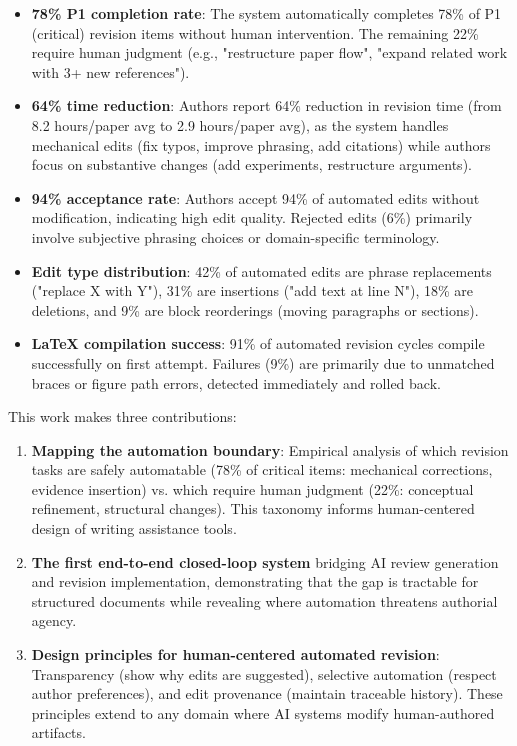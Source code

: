 \begin{itemize}
\item \textbf{78\% P1 completion rate}: The system automatically completes 78\% of P1 (critical) revision items without human intervention. The remaining 22\% require human judgment (e.g., "restructure paper flow", "expand related work with 3+ new references").

\item \textbf{64\% time reduction}: Authors report 64\% reduction in revision time (from 8.2 hours/paper avg to 2.9 hours/paper avg), as the system handles mechanical edits (fix typos, improve phrasing, add citations) while authors focus on substantive changes (add experiments, restructure arguments).

\item \textbf{94\% acceptance rate}: Authors accept 94\% of automated edits without modification, indicating high edit quality. Rejected edits (6\%) primarily involve subjective phrasing choices or domain-specific terminology.

\item \textbf{Edit type distribution}: 42\% of automated edits are phrase replacements ("replace X with Y"), 31\% are insertions ("add text at line N"), 18\% are deletions, and 9\% are block reorderings (moving paragraphs or sections).

\item \textbf{LaTeX compilation success}: 91\% of automated revision cycles compile successfully on first attempt. Failures (9\%) are primarily due to unmatched braces or figure path errors, detected immediately and rolled back.
\end{itemize}

This work makes three contributions:

\begin{enumerate}
\item \textbf{Mapping the automation boundary}: Empirical analysis of which revision tasks are safely automatable (78\% of critical items: mechanical corrections, evidence insertion) vs. which require human judgment (22\%: conceptual refinement, structural changes). This taxonomy informs human-centered design of writing assistance tools.

\item \textbf{The first end-to-end closed-loop system} bridging AI review generation and revision implementation, demonstrating that the gap is tractable for structured documents while revealing where automation threatens authorial agency.

\item \textbf{Design principles for human-centered automated revision}: Transparency (show why edits are suggested), selective automation (respect author preferences), and edit provenance (maintain traceable history). These principles extend to any domain where AI systems modify human-authored artifacts.
\end{enumerate}

